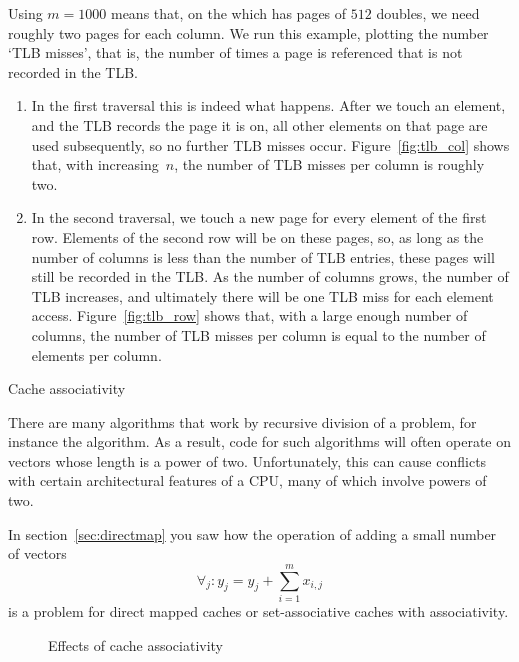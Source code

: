 Using $m=1000$ means that, on the  which
has pages of $512$ doubles, we need roughly two pages for each
column. We run this example, plotting the number `TLB misses', that
is, the number of times a page is referenced that is not recorded in
the TLB.
\begin{enumerate}
\item In the first traversal this is indeed what happens. After we
  touch an element, and the TLB records the page it is on, all other
  elements on that page are used subsequently, so no further TLB
  misses occur. Figure~\ref{fig:tlb_col} shows that, with increasing~$n$,
  the number of TLB misses per column is roughly two.
\item In the second traversal, we touch a new page for every element
  of the first row. Elements of the second row will be on these pages,
  so, as long as the number of columns is less than the number of TLB
  entries, these pages will still be recorded in the TLB. As the
  number of columns grows, the number of TLB increases, and ultimately
  there will be one TLB miss for each element
  access. Figure~\ref{fig:tlb_row} shows that, with a large enough number
  of columns, the number of TLB misses per column is equal to the
  number of elements per column.
\end{enumerate}

 {Cache associativity}
\label{sec:assoc-coding}

There are many algorithms that work by recursive division of a
problem, for instance the  algorithm. As a result, code
for such algorithms will often operate on vectors whose length is a power of
two. Unfortunately, this can cause conflicts with certain
architectural features of a CPU, many of which involve powers of two.


In section~\ref{sec:directmap} you saw how
the operation of adding a small number of vectors
\[ \forall_j\colon y_j= y_j+\sum_{i=1}^mx_{i,j} \]
is a problem for direct mapped caches or set-associative caches with
associativity.

\begin{figure}[t]
  \pgfplotsset{table/col sep=comma}
  \caption{Effects of cache associativity}
  \label{fig:cache-assoc}
\end{figure}

